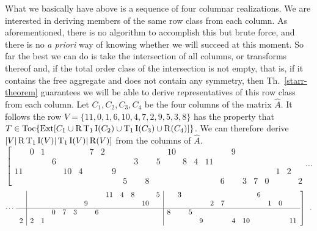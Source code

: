 \begin{example}
    What we basically have above is a sequence of four columnar realizations. We are interested in deriving members of the same row class from each column. As aforementioned, there is no algorithm to accomplish this but brute force, and there is no \emph{a priori} way of knowing whether we will succeed at this moment. So far the best we can do is take the intersection of all columns, or transforms thereof and, if the total order class of the intersection is not empty, that is, if it contains the free aggregate and does not contain any symmetry, then Th.~\ref{starr-theorem} guarantees we will be able to derive representatives of this row class from each column. Let $C_1, C_2, C_3, C_4$ be the four columns of the matrix $\hat{A}$. It follows the row $V = \{ 11, 0, 1, 6, 10, 4, 7, 2, 9, 5, 3, 8 \}$ has the property that $T \in \operatorname{Toc} \{ \operatorname{Ext}[ C_1 \cup \operatorname{R}\operatorname{T}_1\operatorname{I}(C_2) \cup \operatorname{T}_1\operatorname{I}(C_3) \cup \operatorname{R}(C_4) ] \}$. We can therefore derive $[V | \operatorname{R}\operatorname{T}_1\operatorname{I}(V) | \operatorname{T}_1\operatorname{I}(V) | \operatorname{R}(V)]$ from the columns of $\hat{A}$.
    \begin{equation*}
        \left[
        \begin{array}{cccccccccccc|cccccccccccc|c}
            & 0 & 1 &&&& 7 & 2 &&&& && 10 &&&&& 9 &&&&& & \\
            &&& 6 &&&&&&& 3 & & 5 && 8 & 4 & 11 &&&&&&& & \\
            \hline
            11 &&&& 10 & 4 &&& 9 &&& &&&&&&&&&&& 1 & 2 & \\
            &&&&&&&&& 5 && 8 &&&&&& 6 && 3 & 7 & 0 && & 2
        \end{array}
        \right. \cdots
    \end{equation*}
    \begin{equation}
        \cdots \left.
        \begin{array}{c|cccccccccccc|cccccccccccc}
            & &&&&&&& 11 & 4 & 8 && 5 && 3 &&&&&&& 6 &&& \\
            & &&&&& 9 &&&&& 10 & &&&&& 2 & 7 &&&& 1 & 0 & \\
            \hline
            & && 0 & 7 & 3 && 6 &&&&& & 8 && 5 &&&&&&&&& \\
            2 & 2 & 1 &&&&&&&&&& &&&& 9 &&& 4 & 10 &&&& 11
        \end{array} \right] \enspace.
    \end{equation}
\end{example}

